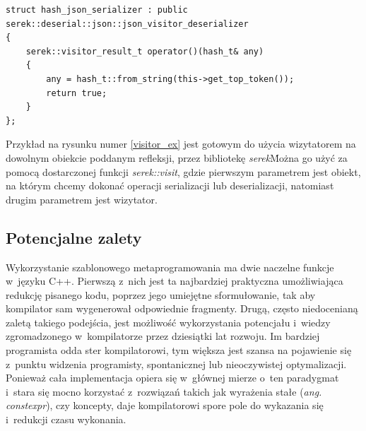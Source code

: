 \documentclass[12pt]{article}
\newcommand{\nonpl}[1]{{\it #1}}
\newcommand{\code}[1]{{\it #1}}
\newcommand{\ang}[1]{\nonpl{ang. #1}}
\newcommand{\serek}{\nonpl{serek}}
\begin{document}
{{{				\begin{captioned}[H]
					\begin{lstlisting}[frame=single]
struct hash_json_serializer : public serek::deserial::json::json_visitor_deserializer
{
	serek::visitor_result_t operator()(hash_t& any)
	{
		any = hash_t::from_string(this->get_top_token());
		return true;
	}
};
					\end{lstlisting}
					\caption{ Przykład implementacji wizytatora, spełniającego wymagania biblioteki \serek, wraz z zdefiniowaną obsługą własnego typu \code{hash_t}}
					\label{visitor_ex}
				\end{captioned}

				Przykład na rysunku numer \ref{visitor_ex} jest gotowym do użycia wizytatorem na dowolnym obiekcie poddanym refleksji, przez bibliotekę
				\serek\. Można go użyć za pomocą dostarczonej funkcji \code{serek::visit}, gdzie pierwszym parametrem jest obiekt, na którym
				chcemy dokonać operacji serializacji lub deserializacji, natomiast drugim parametrem jest wizytator.
			}
		}

		{
			\subsection{Potencjalne zalety}

			Wykorzystanie szablonowego metaprogramowania\cite{wiki_meta} ma dwie naczelne funkcje w~języku C++. Pierwszą z~nich jest
			ta najbardziej praktyczna umożliwiająca redukcję pisanego kodu, poprzez jego umiejętne sformułowanie, tak aby kompilator
			sam wygenerował odpowiednie fragmenty. Drugą, często niedocenianą zaletą takiego podejścia, jest możliwość wykorzystania
			potencjału i~wiedzy zgromadzonego w~kompilatorze przez dziesiątki lat rozwoju. Im bardziej programista odda ster
			kompilatorowi, tym większa jest szansa na pojawienie się z~punktu widzenia programisty, spontanicznej lub nieoczywistej
			optymalizacji. Ponieważ cała implementacja opiera się w~głównej mierze o~ten paradygmat i~stara się mocno korzystać
			z~rozwiązań takich jak wyrażenia stałe (\ang{constexpr}), czy koncepty, daje kompilatorowi spore pole do wykazania się
			i~redukcji czasu wykonania.
		}
	}
\end{document}
